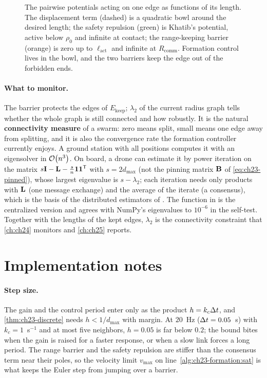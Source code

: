 \begin{figure}[tb]
  \centering
  \caption{The pairwise potentials acting on one edge as functions of its
  length. The displacement term (dashed) is a quadratic bowl around the desired
  length; the safety repulsion (green) is Khatib's potential, active below
  $\rho_0$ and infinite at contact; the range-keeping barrier (orange) is zero
  up to $\ell_{\mathrm{act}}$ and infinite at $R_{\mathrm{comm}}$. Formation
  control lives in the bowl, and the two barriers keep the edge out of the
  forbidden ends.}
  \label{fig:ch23-potentials}
\end{figure}

\paragraph{What to monitor.}
The barrier protects the edges of $E_{\mathrm{keep}}$; $\lambda_2$ of the
current radius graph tells whether the whole graph is still connected and
how robustly. It is the natural \textbf{connectivity measure}
of a swarm: zero means split, small means one edge away from splitting, and it
is also the convergence rate the formation controller currently enjoys. A
ground station with all positions computes it with an eigensolver in
$\mathcal{O}\!\left(n^3\right)$. On board, a drone can estimate it by power iteration on the
matrix $s\mathbf{I} - \mathbf{L} - \frac{s}{n}\mathbf{1}\mathbf{1}^{\mathsf{T}}$ with
$s = 2d_{\max}$ (not the pinning matrix $\mathbf{B}$ of
\cref{eq:ch23-pinned}), whose largest eigenvalue is $s - \lambda_2$; each iteration
needs only products with $\mathbf{L}$ (one message exchange) and the average of
the iterate (a consensus), which is the basis of the distributed estimators of
\textcite{yang2010decentralized}. The function
 in  is the
centralized version and agrees with NumPy's eigenvalues to $10^{-6}$ in the
self-test. Together with the lengths of the kept edges, $\lambda_2$ is the
connectivity constraint that \cref{ch:ch24} monitors and \cref{ch:ch25}
reports.

\section{Implementation notes}
\label{sec:ch23-implementation}

\paragraph{Step size.}
The gain and the control period enter only as the product $h = k_c\Delta t$, and
\cref{thm:ch23-discrete} needs $h < 1/d_{\max}$ with margin. At $20$~Hz
($\Delta t = 0.05$~s) with $k_c = 1$~s$^{-1}$ and at most five neighbors,
$h = 0.05$ is far below $0.2$; the bound bites when the gain is raised for
a faster response, or when a slow link forces a long period. The range barrier
and the safety repulsion are stiffer than the consensus term near their
poles, so the velocity limit $v_{\max}$ on line~\ref{alg:ch23-formation:sat}
is what keeps the Euler step from jumping over a barrier.

